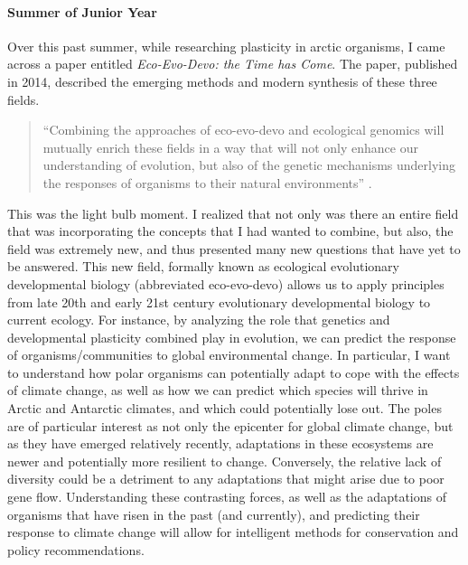 \documentclass{article}
\begin{document}
\hypertarget{summer-of-junior-year}{%
\paragraph{Summer of Junior Year}\label{summer-of-junior-year}}

Over this past summer, while researching plasticity in arctic organisms,
I came across a paper entitled \emph{Eco-Evo-Devo: the Time has Come}.
The paper, published in 2014, described the emerging methods and modern
synthesis of these three fields.

\begin{quote}
``Combining the approaches of eco-evo-devo and ecological genomics will
mutually enrich these fields in a way that will not only enhance our
understanding of evolution, but also of the genetic mechanisms
underlying the responses of organisms to their natural environments''
\autocite{Abouheif2014}.
\end{quote}

This was the light bulb moment. I realized that not only was there an
entire field that was incorporating the concepts that I had wanted to
combine, but also, the field was extremely new, and thus presented many
new questions that have yet to be answered. This new field, formally
known as ecological evolutionary developmental biology (abbreviated
eco-evo-devo) allows us to apply principles from late 20th and early
21st century evolutionary developmental biology to current ecology. For
instance, by analyzing the role that genetics and developmental
plasticity combined play in evolution, we can predict the response of
organisms/communities to global environmental change. In particular, I
want to understand how polar organisms can potentially adapt to cope
with the effects of climate change, as well as how we can predict which
species will thrive in Arctic and Antarctic climates, and which could
potentially lose out. The poles are of particular interest as not only
the epicenter for global climate change, but as they have emerged
relatively recently, adaptations in these ecosystems are newer and
potentially more resilient to change. Conversely, the relative lack of
diversity could be a detriment to any adaptations that might arise due
to poor gene flow. Understanding these contrasting forces, as well as
the adaptations of organisms that have risen in the past (and
currently), and predicting their response to climate change will allow
for intelligent methods for conservation and policy recommendations.
\end{document}
